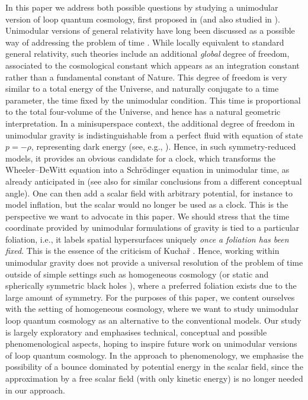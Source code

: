 \documentclass[aps,prd,11pt,showkeys,nofootinbib]{revtex4-2}
\begin{document}
In this paper we address both possible questions by studying a unimodular version of loop quantum cosmology, first proposed in \cite{Chiou:2010ne} (and also studied in \cite{Gielen:2024qml}). Unimodular versions of general relativity \cite{Buchmuller:1988yn,Finkelstein:2000pg,Henneaux:1989zc} have long been discussed as a possible way of addressing the problem of time \cite{Sorkin:1987cd,Unruh:1989db,Kuchar:1991xd}. While locally equivalent to standard general relativity, such theories include an additional {\em global} degree of freedom, associated to the cosmological constant which appears as an integration constant rather than a fundamental constant of Nature. This degree of freedom is very similar to a total energy of the Universe, and naturally conjugate to a time parameter, the time fixed by the unimodular condition. This time is proportional to the total four-volume of the Universe, and hence has a natural geometric interpretation. In a minisuperspace context, the additional degree of freedom in unimodular gravity is indistinguishable from a perfect fluid with equation of state $p=-\rho$, representing dark energy (see, e.g., \cite{Gielen:2022tzi}). Hence, in such symmetry-reduced models, it provides an obvious candidate for a clock, which transforms the Wheeler--DeWitt equation into a Schr\"odinger equation in unimodular time, as already anticipated in \cite{Sorkin:1987cd,Unruh:1989db} (see also \cite{Gryb:2018whn} for similar conclusions from a different conceptual angle). One can then add a scalar field with arbitrary potential, for instance to model inflation, but the scalar would no longer be used as a clock. This is the perspective we want to advocate in this paper. We should stress that the time coordinate provided by unimodular formulations of gravity is tied to a particular foliation, i.e., it labels spatial hypersurfaces uniquely {\em once a foliation has been fixed}. This is the essence of the criticism of Kucha\v{r} \cite{Kuchar:1991xd}. Hence, working within unimodular gravity does not provide a universal resolution of the problem of time outside of simple settings such as homogeneous cosmology (or static and spherically symmetric black holes \cite{Gielen:2025ovv}), where a preferred foliation exists due to the large amount of symmetry. For the purposes of this paper, we content ourselves with the setting of homogeneous cosmology, where we want to study unimodular loop quantum cosmology as an alternative to the conventional models. Our study is largely exploratory and emphasises technical, conceptual and possible phenomenological aspects, hoping to inspire future work on unimodular versions of loop quantum cosmology. In the approach to phenomenology, we emphasise the possibility of a bounce dominated by potential energy in the scalar field, since the approximation by a free scalar field (with only kinetic energy) is no longer needed in our approach.
\end{document}
